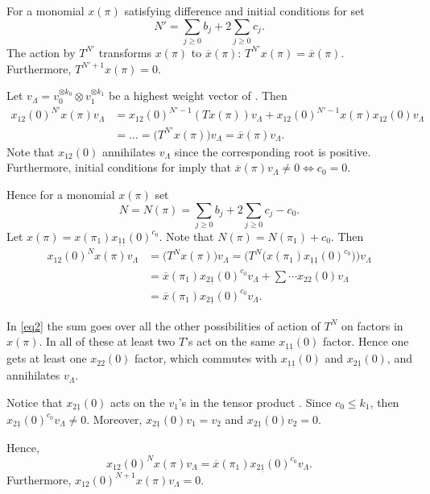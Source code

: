 \documentclass[10pt,a4paper]{amsart}
\newcommand{\ox}
{{\overline{x}}}
\numberwithin{equation}{section}
\begin{document}
For a monomial $x(\pi)$ satisfying difference and initial conditions for  set
\[N'=\sum_{j\geq 0} b_j + 2\sum_{j\geq 0} c_j.\]
The action by $T^{N'}$ transforms $x(\pi)$ to $\ox(\pi)$:
$T^{N'} x(\pi) = \ox (\pi)$.
Furthermore,
$T^{N'+1} x(\pi) = 0$.

Let $v_\Lambda=v_0^{\otimes k_0} \otimes v_1^{\otimes k_1}$ be a highest weight vector of .
Then
\begin{align*}
	x_{12}(0)^{N'} x(\pi) v_\Lambda & = x_{12}(0)^{N'-1} (T x(\pi)) v_\Lambda + x_{12}(0)^{N'-1} x(\pi) x_{12}(0) v_\Lambda \\
	& = \dots= \bigl(T^{N'} x(\pi)\bigr) v_\Lambda= \ox(\pi) v_\Lambda.
\end{align*}
Note that $x_{12}(0)$ annihilates $v_\Lambda$ since the corresponding root is positive.
Furthermore, initial conditions for  imply that
$\ox(\pi) v_\Lambda \neq 0 \Leftrightarrow c_0=0$.

Hence for a monomial $x(\pi)$ set
\[N = N(\pi) =\sum_{j\geq 0} b_j + 2\sum_{j\geq 0} c_j - c_0.\]
Let $x(\pi)=x(\pi_1)x_{\underline{1} \underline{1}}(0)^{c_0}$. Note that $N(\pi) = N(\pi_1) + c_0$.
Then
\begin{align}
x_{12}(0)^N x(\pi) v_\Lambda & =  \bigl(T^N x(\pi)\bigr) v_\Lambda = \bigl(T^N \bigl(x(\pi_1)x_{\underline{1}\underline{1}}(0)^{c_0}\bigr)\bigr) v_\Lambda\nonumber\\
\label{eq2}	& = \ox(\pi_1)x_{2\underline{1}}(0)^{c_0} v_\Lambda + \sum \cdots x_{2 2}(0) v_\Lambda \\
\label{eq3}	& = \ox(\pi_1)x_{2\underline{1}}(0)^{c_0} v_\Lambda.
\end{align}

In \eqref{eq2} the sum goes over all the other possibilities of action of $T^N$ on factors in $x(\pi)$. In all of these at least two $T$'s act on the same $x_{\underline{1} \underline{1}}(0)$ factor. Hence one gets at least one $x_{2 2}(0)$ factor, which commutes with $x_{\underline{1} \underline{1}}(0)$ and $x_{2 \underline{1}}(0)$, and annihilates $v_\Lambda$.

Notice that $x_{2\underline{1}}(0)$ acts on the $v_1$'s in the tensor product . Since $c_0\leq k_1$, then $x_{2\underline{1}}(0)^{c_0} v_\Lambda\neq 0$.
Moreover, $x_{2\underline{1}}(0) v_1 = v_2$ and $x_{2\underline{1}}(0) v_2 = 0$.

Hence,
\begin{equation} \label{trans}
x_{12}(0)^N x(\pi)v_\Lambda = \ox(\pi_1) x_{2\underline{1}}(0)^{c_0} v_\Lambda.
\end{equation}
Furthermore,
$x_{12}(0)^{N+1} x(\pi)v_\Lambda = 0$.
\end{document}
